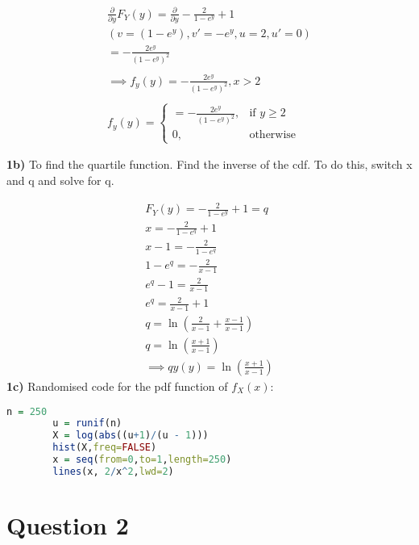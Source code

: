 \documentclass[oneside, a4paper]{article}
\begin{document}
\begin{equation}
    \begin{split}
    \frac{\partial }{\partial y} F_Y(y) = \frac{\partial }{\partial y}-\frac{2}{1 - e^y} + 1 \\
    \left(v = (1 - e^y), v' = -e^y, u = 2, u' = 0  \right)\\
    = -\frac{2e^y}{\left(1 -e^y \right)^2} \\\\
    \implies f_y(y) = -\frac{2e^y}{\left(1 -e^y \right)^2}, x > 2 \\\\
        f_y(y)= 
    \begin{cases}
        = -\frac{2e^y}{\left(1 -e^y \right)^2},& \text{if } y\geq 2\\
        0,              & \text{otherwise}
    \end{cases}
    \end{split}
\end{equation}

\textbf{1b)} To find the quartile function. Find the inverse of the cdf. To do this, switch x and q and solve for q.

\begin{equation}
    \begin{split}
    F_Y(y) = -\frac{2}{1 - e^y} + 1 = q \\
    x = -\frac{2}{1 - e^q} + 1 \\
    x - 1 = -\frac{2}{1 - e^q} \\ 
    1 - e^q = -\frac{2}{x - 1} \\ 
    e^q - 1 = \frac{2}{x - 1} \\ 
    e^q = \frac{2}{x - 1} + 1 \\ 
    q = \ln{\left(\frac{2}{x - 1} + \frac{x - 1}{x - 1}\right)} \\ 
    q = \ln{\left(\frac{x + 1}{x - 1}\right)} \\ 
    \implies qy(y) = \ln{\left(\frac{x + 1}{x - 1}\right)}
    \end{split}
\end{equation} 
\textbf{1c)} Randomised code for the pdf function of $f_X(x)$:
    \begin{lstlisting}[language=R]
        n = 250
        u = runif(n)
        X = log(abs((u+1)/(u - 1)))
        hist(X,freq=FALSE)
        x = seq(from=0,to=1,length=250)
        lines(x, 2/x^2,lwd=2)
    \end{lstlisting}

\section{Question 2}
\end{document}
